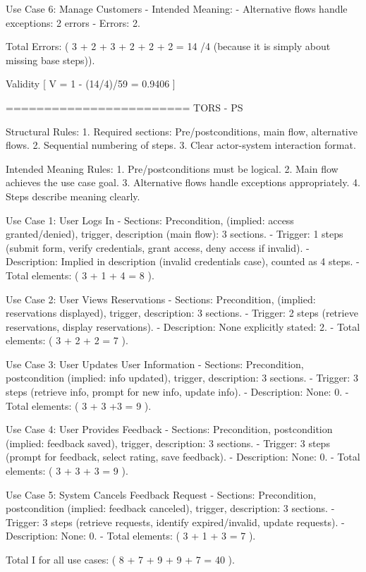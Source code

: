 Use Case 6: Manage Customers
- Intended Meaning:
- Alternative flows handle exceptions: 2 errors
- Errors: 2.

Total Errors: ( 3 + 2 + 3 + 2 + 2 + 2 = 14 /4 (because it is simply about missing base steps)).

Validity
[
V = 1 - (14/4)/59 = 0.9406
]

========================
TORS - PS

Structural Rules:
1. Required sections: Pre/postconditions, main flow, alternative flows.
2. Sequential numbering of steps.
3. Clear actor-system interaction format.

Intended Meaning Rules:
1. Pre/postconditions must be logical.
2. Main flow achieves the use case goal.
3. Alternative flows handle exceptions appropriately.
4. Steps describe meaning clearly.

Use Case 1: User Logs In
- Sections: Precondition, (implied: access granted/denied), trigger, description (main flow): 3 sections.
- Trigger: 1 steps (submit form, verify credentials, grant access, deny access if invalid).
- Description: Implied in description (invalid credentials case), counted as 4 steps.
- Total elements: ( 3 + 1 + 4 = 8 ).

Use Case 2: User Views Reservations
- Sections: Precondition, (implied: reservations displayed), trigger, description: 3 sections.
- Trigger: 2 steps (retrieve reservations, display reservations).
- Description: None explicitly stated: 2.
- Total elements: ( 3 + 2 + 2 = 7 ).

Use Case 3: User Updates User Information
- Sections: Precondition, postcondition (implied: info updated), trigger, description: 3 sections.
- Trigger: 3 steps (retrieve info, prompt for new info, update info).
- Description: None: 0.
- Total elements: ( 3 + 3 +3 = 9 ).

Use Case 4: User Provides Feedback
- Sections: Precondition, postcondition (implied: feedback saved), trigger, description: 3 sections.
- Trigger: 3 steps (prompt for feedback, select rating, save feedback).
- Description: None: 0.
- Total elements: ( 3 + 3 + 3 = 9 ).

Use Case 5: System Cancels Feedback Request
- Sections: Precondition, postcondition (implied: feedback canceled), trigger, description: 3 sections.
- Trigger: 3 steps (retrieve requests, identify expired/invalid, update requests).
- Description: None: 0.
- Total elements: ( 3 + 1 + 3 = 7 ).

Total I for all use cases: ( 8 + 7 + 9 + 9 + 7 = 40 ).


